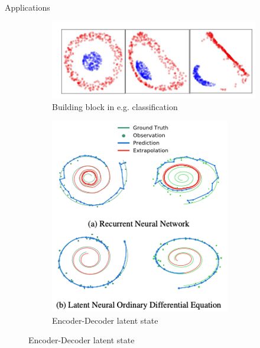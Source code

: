 \documentclass[usenames,dvipsnames]{beamer}
\theoremstyle{definition}
\let\oldcite=\cite
\renewcommand{\cite}[2][]{\textcolor{green}{\oldcite[#1]{#2}}}
\begin{document}

\begin{frame}{Applications}
\begin{figure}    
    \begin{subfigure}[t]{.45\textwidth}
        \centering
        \includegraphics[width=.85\linewidth]{2d_class_node.png}
        \caption{Building block in e.g. classification \cite{dupont_augmented_2019}}
      \end{subfigure}
      \qquad
      \begin{subfigure}[t]{.45\textwidth}
        \centering
        \includegraphics[width=.5\linewidth]{chen_latent_node.png}
        \caption{Encoder-Decoder latent state \cite{chen2019neural}}
      \end{subfigure}
    
      \medskip
    

\end{figure}
\end{frame}
\end{document}

